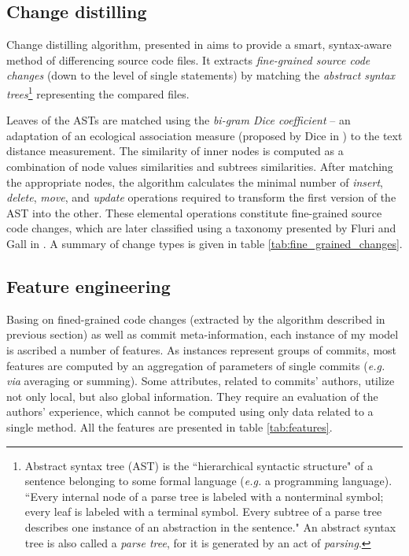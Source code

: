 \documentclass{pracamgr}
\begin{document}
\subsection{Change distilling}
\label{sec:change_distilling}
Change distilling algorithm, presented in \cite{change_distilling} aims to provide a smart, syntax-aware method of differencing source code files. It extracts \emph{fine-grained source code changes} (down to the level of single statements) by matching the \emph{abstract syntax trees}\footnote{Abstract syntax tree (AST) is the ``hierarchical syntactic structure" of a sentence belonging to some formal language (\textit{e.g.} a programming language). ``Every internal node of a parse tree is labeled with a nonterminal symbol; every leaf is labeled with a terminal symbol. Every subtree of a parse tree describes one instance of an abstraction in the sentence." \cite[p. 121]{concepts} An abstract syntax tree is also called a \emph{parse tree}, for it is generated by an act of \emph{parsing}.} representing the compared files.

Leaves of the ASTs are matched using the \emph{bi-gram Dice coefficient} -- an adaptation of an ecological association measure (proposed by Dice in \cite{Dice}) to the text distance measurement. The similarity of inner nodes is computed as a combination of node values similarities and subtrees similarities. After matching the appropriate nodes, the algorithm calculates the minimal number of \emph{insert}, \emph{delete}, \emph{move}, and \emph{update} operations required to transform the first version of the AST into the other. These elemental operations constitute fine-grained source code changes, which are later classified using a taxonomy presented by Fluri and Gall in \cite{classifying}. A summary of change types is given in table \ref{tab:fine_grained_changes}.

\addtocounter{footnote}{1}
\addtocounter{footnote}{-1}


\subsection{Feature engineering}
\label{sec:feature_engineering}
Basing on fined-grained code changes (extracted by the algorithm described in previous section) as well as commit meta-information, each instance of my model is ascribed a number of features. As instances represent groups of commits, most features are computed by an aggregation of parameters of single commits (\textit{e.g. via} averaging or summing). Some attributes, related to commits' authors, utilize not only local, but also global information. They require an evaluation of the authors' experience, which cannot be computed using only data related to a single method. All the features are presented in table \ref{tab:features}.
\end{document}

